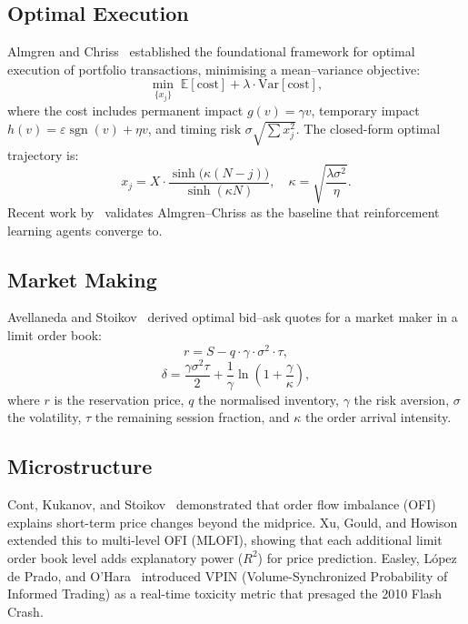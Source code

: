 \documentclass[11pt]{article}
\theoremstyle{definition}
\begin{document}
\subsection{Optimal Execution}
Almgren and Chriss~\cite{almgren2000} established the foundational
framework for optimal execution of portfolio transactions, minimising
a mean--variance objective:
\begin{equation}
  \min_{\{x_j\}} \; \mathbb{E}[\text{cost}] + \lambda \cdot
  \text{Var}[\text{cost}],
  \label{eq:ac-objective}
\end{equation}
where the cost includes permanent impact $g(v) = \gamma v$, temporary
impact $h(v) = \varepsilon \operatorname{sgn}(v) + \eta v$, and timing
risk $\sigma \sqrt{\sum x_j^2}$. The closed-form optimal trajectory is:
\begin{equation}
  x_j = X \cdot \frac{\sinh\bigl(\kappa(N-j)\bigr)}
                       {\sinh(\kappa N)},
  \quad \kappa = \sqrt{\frac{\lambda \sigma^2}{\eta}}.
  \label{eq:ac-trajectory}
\end{equation}
Recent work by~\cite{ning2026} validates Almgren--Chriss as the
baseline that reinforcement learning agents converge to.

\subsection{Market Making}
Avellaneda and Stoikov~\cite{avellaneda2008} derived optimal
bid--ask quotes for a market maker in a limit order book:
\begin{equation}
  r = S - q \cdot \gamma \cdot \sigma^2 \cdot \tau,
  \label{eq:as-reservation}
\end{equation}
\begin{equation}
  \delta = \frac{\gamma \sigma^2 \tau}{2} +
  \frac{1}{\gamma} \ln\!\left(1 + \frac{\gamma}{\kappa}\right),
  \label{eq:as-spread}
\end{equation}
where $r$ is the reservation price, $q$ the normalised inventory,
$\gamma$ the risk aversion, $\sigma$ the volatility, $\tau$ the
remaining session fraction, and $\kappa$ the order arrival intensity.

\subsection{Microstructure}
Cont, Kukanov, and Stoikov~\cite{cont2014} demonstrated that
order flow imbalance (OFI) explains short-term price changes beyond
the midprice. Xu, Gould, and Howison~\cite{xu2019} extended this to
multi-level OFI (MLOFI), showing that each additional limit order
book level adds explanatory power ($R^2$) for price prediction.
Easley, L\'opez de Prado, and O'Hara~\cite{easley2012} introduced
VPIN (Volume-Synchronized Probability of Informed Trading) as a
real-time toxicity metric that presaged the 2010 Flash Crash.
\end{document}
